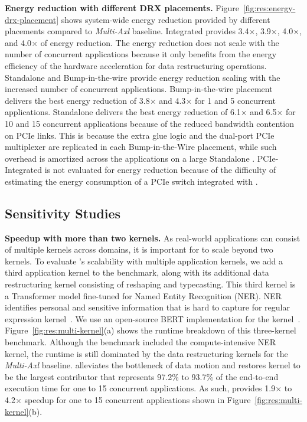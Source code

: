 \noindent \textbf{Energy reduction with different DRX placements.}
%
Figure~\ref{fig:res:energy-drx-placement} shows system-wide energy reduction provided by different \drx placements compared to \emph{Multi-Axl} baseline.
%
Integrated \drx provides 3.4$\times$, 3.9$\times$, 4.0$\times$, and 4.0$\times$ of energy reduction. 
%
The energy reduction does not scale with the number of concurrent applications because it only benefits from the energy efficiency of the \drx hardware acceleration for data restructuring operations. 
%
Standalone \drx and Bump-in-the-wire \drx provide energy reduction scaling with the increased number of concurrent applications.
%
Bump-in-the-wire \drx placement delivers the best energy reduction of 3.8$\times$ and 4.3$\times$ for 1 and 5 concurrent applications. 
%
Standalone \drx delivers the best energy reduction of 6.1$\times$ and 6.5$\times$ for 10 and 15 concurrent applications because of the reduced bandwidth contention on PCIe links.
%
This is because the extra glue logic and the dual-port PCIe multiplexer are replicated in each Bump-in-the-Wire \drx placement, while such overhead is amortized across the applications on a large Standalone \drx. 
%
PCIe-Integrated is not evaluated for energy reduction because of the difficulty of estimating the energy consumption of a PCIe switch integrated with \drx.
%
\subsection{Sensitivity Studies}
%
\noindent \textbf{Speedup with more than two kernels.}
%
As real-world applications can consist of multiple kernels across domains, it is important for \dmx to scale beyond two kernels. 
%
To evaluate \dmx's scalability with multiple application kernels, 
%
we add a third application kernel to the \pir benchmark, along with its additional data restructuring kernel consisting of reshaping and typecasting. 
%
This third kernel is a Transformer model fine-tuned for Named Entity Recognition (NER). NER identifies personal and sensitive information that is hard to capture for regular expression kernel~\cite{ner-transformer}.
%
We use an open-source BERT implementation for the kernel~\cite{verigoodml:iccad:2021}.
%
%
Figure~\ref{fig:res:multi-kernel}(a) shows the runtime breakdown of this three-kernel benchmark. 
%
Although the benchmark included the compute-intensive NER kernel, the runtime is still dominated by the data restructuring kernels for the \emph{Multi-Axl} baseline.
%
\dmx alleviates the bottleneck of data motion and restores kernel to be the largest contributor that represents 97.2\% to 93.7\% of the end-to-end execution time for one to 15 concurrent applications.  
%
As such, \dmx provides 1.9$\times$ to 4.2$\times$ speedup for one to 15 concurrent applications shown in Figure~\ref{fig:res:multi-kernel}(b).

